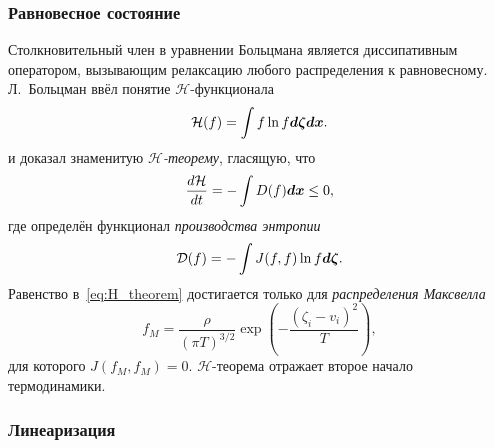 \subsubsection{Равновесное состояние}

Столкновительный член в уравнении Больцмана является диссипативным оператором,
вызывающим релаксацию любого распределения к равновесному.
Л.~Больцман ввёл понятие \(\mathcal{H}\)-функционала
\begin{equation}\label{eq:H_function}
    \mathcal{H}(f) = \int f \ln f \dzeta \dx.
\end{equation}
и доказал знаменитую \emph{\(\mathcal{H}\)-теорему}, гласящую, что
\begin{equation}\label{eq:H_theorem}
    \der[\mathcal{H}]{t} = -\int D(f) \dx \leq 0,
\end{equation}
где определён функционал \emph{производства энтропии}
\begin{equation}\label{eq:entropy_production}
    \mathcal{D}(f) = -\int J(f,f) \ln f \dzeta.
\end{equation}
Равенство в~\eqref{eq:H_theorem} достигается только для \emph{распределения Максвелла}
\begin{equation}\label{eq:Maxwell_distribution}
    f_M = \frac{\rho}{(\pi T)^{3/2}} \exp \left( -\frac{(\zeta_i-v_i)^2}{T} \right),
\end{equation}
для которого \(J(f_M,f_M) = 0\).
\(\mathcal{H}\)-теорема отражает второе начало термодинамики.

\subsubsection{Линеаризация}

